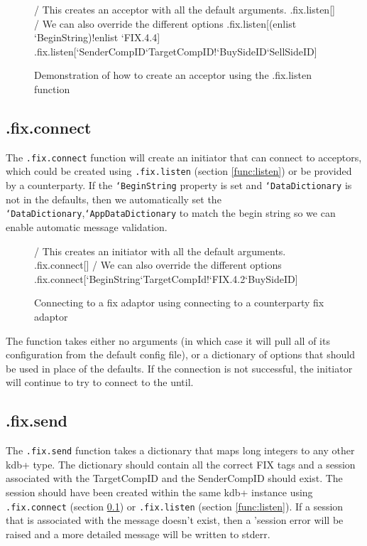 \begin{figure}[H]
\begin{qcode}
/ This creates an acceptor with all the default arguments.
.fix.listen[] 
/ We can also override the different options 
.fix.listen[(enlist `BeginString)!enlist `FIX.4.4]
.fix.listen[`SenderCompID`TargetCompID!`BuySideID`SellSideID]
\end{qcode}
\caption{Demonstration of how to create an acceptor using the .fix.listen function}
\end{figure}

\subsection{.fix.connect}
\label{func:connect}

The \texttt{.fix.connect} function will create an initiator that can connect to acceptors, which could be created using \texttt{.fix.listen} (section \ref{func:listen}) or be provided by a counterparty. If the \texttt{`BeginString} property is set and \texttt{`DataDictionary}
is not in the defaults, then we automatically set the \texttt{`DataDictionary},\texttt{`AppDataDictionary} to match the begin string so we can enable automatic message validation.

\begin{figure}[H]
\begin{qcode}
/ This creates an initiator with all the default arguments.
.fix.connect[]
/ We can also override the different options
.fix.connect[`BeginString`TargetCompId!`FIX.4.2`BuySideID]
\end{qcode}
\caption{Connecting to a fix adaptor using connecting to a counterparty fix adaptor}
\end{figure}

The function takes either no arguments (in which case it will pull all of its configuration from the default config file), or a dictionary of options that
should be used in place of the defaults. If the connection is not successful, the
initiator will continue to try to connect to the until.

\subsection{.fix.send}
\label{func:send}

The \texttt{.fix.send} function takes a dictionary that maps long integers to any other kdb+ type. The dictionary should contain all the correct FIX tags and a session associated with the TargetCompID and the SenderCompID should exist. The session should have been created within the same kdb+ instance using \texttt{.fix.connect} (section \ref{func:connect}) or \texttt{.fix.listen} (section \ref{func:listen}). If a session that is associated with the message doesn't exist, then a 'session error will be raised and a more detailed message will be written to stderr.

